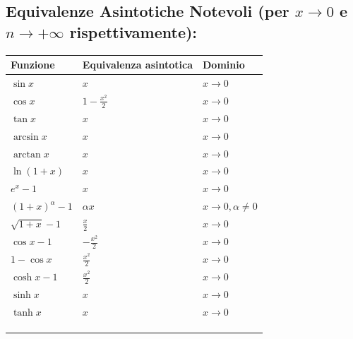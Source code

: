 \documentclass[10pt, a4paper]{article}
\begin{document}
    \subsection{Equivalenze Asintotiche Notevoli (per $x \to 0$ e $n \to +\infty$ rispettivamente):}
        \begin{center}
            \begin{tabular}{|lll|}
                \hline
                \textbf{Funzione} & \textbf{Equivalenza asintotica} & \textbf{Dominio}\\
                \hline
                $\sin x$ & $x$ & $x \to 0$ \\
                \hline
                $\cos x$ & $1-\frac{x^2}{2}$ & $x \to 0$ \\
                \hline
                $\tan x$ & $x$ & $x \to 0$ \\
                \hline
                $\arcsin x$ & $x$ & $x \to 0$ \\
                \hline
                $\arctan x$ & $x$ & $x \to 0$ \\
                \hline
                $\ln(1+x)$ & $x$ & $x \to 0$ \\
                \hline
                $e^x - 1$ & $x$ & $x \to 0$ \\
                \hline
                $(1+x)^\alpha - 1$ & $\alpha x$ & $x \to 0, \alpha \neq 0$ \\
                \hline
                $\sqrt{1+x} - 1$ & $\frac{x}{2}$ & $x \to 0$ \\
                \hline
                $\cos x - 1$ & $-\frac{x^2}{2}$ & $x \to 0$ \\
                \hline
                $1 - \cos x$ & $\frac{x^2}{2}$ & $x \to 0$ \\
                \hline
                $\cosh x - 1$ & $\frac{x^2}{2}$ & $x \to 0$ \\
                \hline
                $\sinh x$ & $x$ & $x \to 0$ \\
                \hline
                $\tanh x$ & $x$ & $x \to 0$ \\
                \hline
                &&\\
                \hline
                &&\\
                \hline
                &&\\
                \hline
            \end{tabular}
            \begin{tabular}{|ll|}

\end{tabular}
\end{center}
\end{document}
